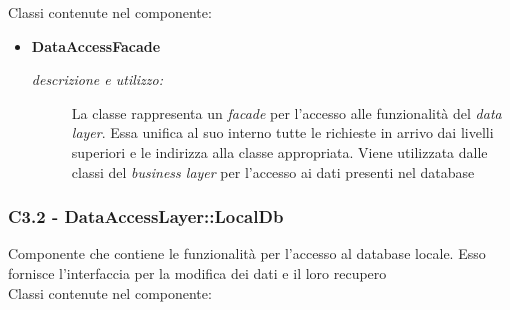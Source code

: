 Classi contenute nel componente: 
\begin{itemize} 
\item \textbf{DataAccessFacade}
\begin{description}
\item [\textit{descrizione e utilizzo:}] La classe rappresenta un \textit{facade} per l'accesso alle funzionalità del \textit{data layer}. Essa unifica al suo interno tutte le richieste in arrivo dai livelli superiori e le indirizza alla classe appropriata. Viene utilizzata dalle classi del \textit{business layer} per l'accesso ai dati presenti nel database
\end{description}
\end{itemize}

\subsubsection{C3.2 - DataAccessLayer::LocalDb} \label{sec:c3.2}
Componente che contiene le funzionalità per l'accesso al database locale. Esso fornisce l'interfaccia per la modifica dei dati e il loro recupero\\
Classi contenute nel componente: 
